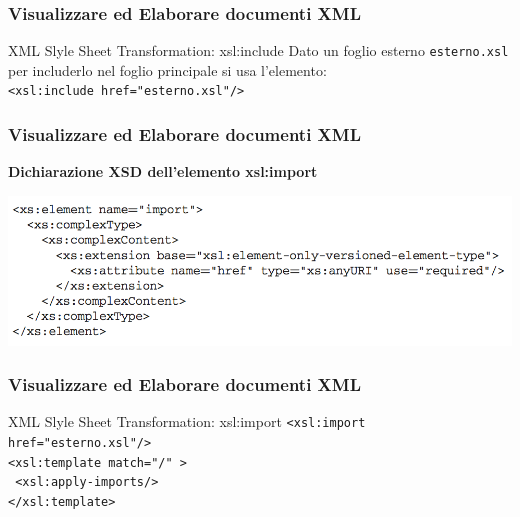 \begin{frame}
    \frametitle{Visualizzare ed Elaborare documenti XML}
    \addtocounter{nframe}{1}
    

     \begin{block}{XML Slyle Sheet Transformation: xsl:include}
        Dato un foglio esterno \texttt{esterno.xsl} per includerlo nel foglio principale si usa l'elemento: \\\texttt{<xsl:include href="esterno.xsl"/>}
     \end{block}

\end{frame}

\begin{frame}
    \frametitle{Visualizzare ed Elaborare documenti XML}
    \addtocounter{nframe}{1}
    
    \textbf{Dichiarazione XSD dell'elemento xsl:import}

    \begin{center}
        \includegraphics[width=.95\textwidth]{imgs/elementXSL-Import.png}
    \end{center}

\end{frame}

\begin{frame}
    \frametitle{Visualizzare ed Elaborare documenti XML}
    \addtocounter{nframe}{1}
    

     \begin{block}{XML Slyle Sheet Transformation: xsl:import}
        \texttt{<xsl:import href="esterno.xsl"/>}
        \\\texttt{<xsl:template match="/" >}
        \\\texttt{ <xsl:apply-imports/>}
        \\\texttt{</xsl:template>}
     \end{block}

\end{frame}

